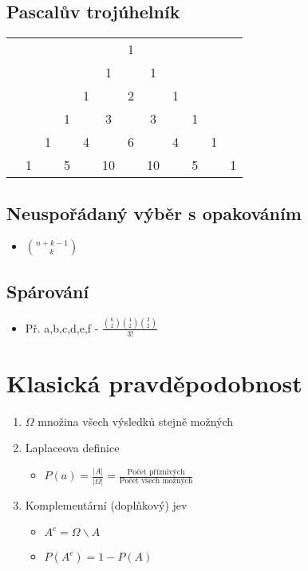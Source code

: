    \subsection{Pascalův trojúhelník}
        \begin{tabular}{cccccccccccc}
            & & & & & &1& & & & & \\
            & & & & &1& &1& & & & \\
            & & & &1& &2& &1& & & \\
            & & &1& &3& &3& &1& & \\
            & &1& &4& &6& &4& &1& \\
            &1& &5& &10& &10& &5& &1
        \end{tabular}
    \subsection{Neuspořádaný výběr s opakováním}
        \begin{itemize}
            \item ${{n+k-1}\choose k}$
        \end{itemize}
    \subsection{Spárování}
        \begin{itemize}
            \item Př. a,b,c,d,e,f - $\frac{{6 \choose 2}{4 \choose 2}{2 \choose 2}}{3!}$
        \end{itemize}
\section{Klasická pravděpodobnost}
    \begin{enumerate}
        \item $\Omega$ množina všech výsledků stejně možných
        \item Laplaceova definice
            \begin{itemize}
                \item $P(a)=\frac{|A|}{|\Omega|} = \frac{\mbox{Počet příznivých}}{\mbox{Počet všech možných}}$
            \end{itemize}
        \item Komplementární (doplňkový) jev
            \begin{itemize}
                \item $A^c=\Omega \backslash A$
                \item $P(A^c)=1-P(A)$
            \end{itemize}
    \end{enumerate}

